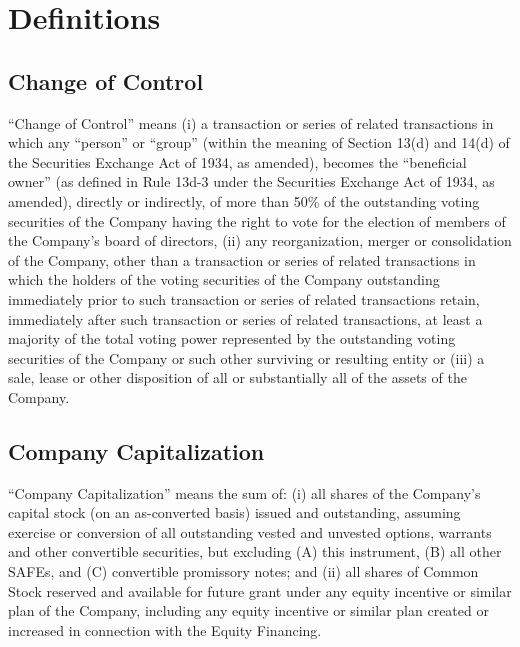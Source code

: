 \section{Definitions}
\label{sec:definitions}

\subsection{Change of Control}
\label{sec:changeofcontrol}

\begin{sloppypar}
“Change of Control” means (i) a transaction or series of related
transactions in which any “person” or “group” (within the meaning of
Section 13(d) and 14(d) of the Securities Exchange Act of 1934, as
amended), becomes the “beneficial owner” (as defined in Rule 13d-3
under the Securities Exchange Act of 1934, as amended), directly or
indirectly, of more than 50\% of the outstanding voting securities of
the Company having the right to vote for the election of members of
the Company’s board of directors, (ii) any reorganization, merger or
consolidation of the Company, other than a transaction or series of
related transactions in which the holders of the voting securities of
the Company outstanding immediately prior to such transaction or
series of related transactions retain, immediately after such
transaction or series of related transactions, at least a majority of
the total voting power represented by the outstanding voting
securities of the Company or such other surviving or resulting entity
or (iii) a sale, lease or other disposition of all or substantially
all of the assets of the Company.
\end{sloppypar}

\ifcap
\subsection{Company Capitalization}
\label{sec:companycapitalization}
“Company Capitalization” means the sum of: (i) all shares of the
Company’s capital stock (on an as-converted basis) issued and
outstanding, assuming exercise or conversion of all outstanding vested
and unvested options, warrants and other convertible securities, but
excluding (A) this instrument, (B) all other SAFEs, and (C)
convertible promissory notes; and (ii) all shares of Common Stock
reserved and available for future grant under any equity incentive or
similar plan of the Company, including any equity incentive or similar
plan created or increased in connection with the Equity Financing.
\fi

